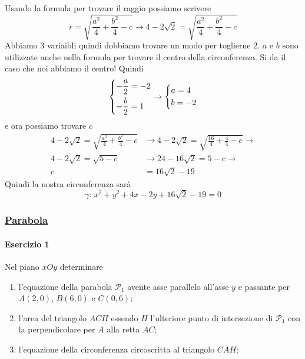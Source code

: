 Usando la formula per trovare il raggio possiamo scrivere
\begin{equation*}
r = \sqrt{\frac{a^2}{4}+\frac{b^2}{4}-c} \rightarrow 
4-2\sqrt{2} = \sqrt{\frac{a^2}{4}+\frac{b^2}{4}-c}
\end{equation*}
Abbiamo 3 variaibli quindi dobbiamo trovare un modo per toglierne 2. $a$ e $b$ sono utilizzate anche 
nella formula per trovare il centro della circonferenza. Si da il caso che noi abbiamo il centro!
Quindi
\begin{equation*}
\begin{dcases}
-\frac{a}{2} = -2\\
-\frac{b}{2} = 1
\end{dcases}\rightarrow
\begin{dcases}
a=4\\
b=-2
\end{dcases}
\end{equation*}
e ora possiamo trovare $c$
\begin{align*}
4-2\sqrt{2} = \sqrt{\frac{a^2}{4}+\frac{b^2}{4}-c} &\rightarrow 
4-2\sqrt{2} = \sqrt{\frac{16}{4}+\frac{4}{4}-c} \rightarrow\\
4-2\sqrt{2} = \sqrt{5-c} &\rightarrow
24-16\sqrt{2} = 5-c \rightarrow\\
c &= 16\sqrt{2}-19
\end{align*}
Quindi la nostra circonferenza sarà
\begin{equation*}
\boxed{\gamma:\, x^2+y^2+4x-2y+16\sqrt{2}-19=0}
\end{equation*}

\subsubsection*{\hyperref[subsec:geomanal:parabola]{Parabola}}\label{ex:parabola}
\paragraph{Esercizio 1}
Nel piano $xOy$ determinare
\begin{enumerate}
	\item l'equazione della parabola $\mathscr{P}_1$ avente asse parallelo all'asse $y$ e passante per
	$A(2,0)$, $B(6,0)$ e $C(0,6)$;\label{enum:ex:parabola:1:1}
	\item l'area del triangolo $ACH$ essendo $H$ l'ulteriore punto di intersezione di $\mathscr{P}_1$
	con la perpendicolare per $A$ alla retta $AC$;\label{enum:ex:parabola:1:2}
	\item l'equazione della circonferenza circoscritta al triangolo $CAH$;\label{enum:ex:parabola:1:3}
\end{enumerate}
\divisor

